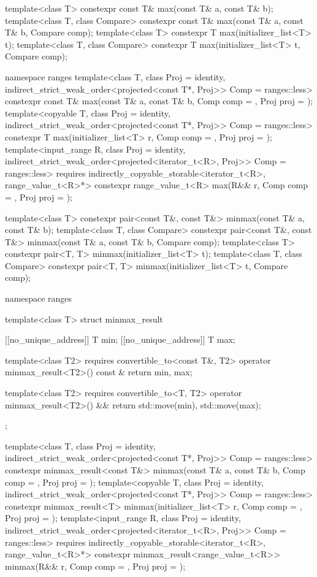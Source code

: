 \begin{codeblock}
{  template<class T> constexpr const T& max(const T& a, const T& b);
  template<class T, class Compare>
    constexpr const T& max(const T& a, const T& b, Compare comp);
  template<class T>
    constexpr T max(initializer_list<T> t);
  template<class T, class Compare>
    constexpr T max(initializer_list<T> t, Compare comp);

  namespace ranges {
    template<class T, class Proj = identity,
             indirect_strict_weak_order<projected<const T*, Proj>> Comp = ranges::less>
      constexpr const T& max(const T& a, const T& b, Comp comp = {}, Proj proj = {});
    template<copyable T, class Proj = identity,
             indirect_strict_weak_order<projected<const T*, Proj>> Comp = ranges::less>
      constexpr T max(initializer_list<T> r, Comp comp = {}, Proj proj = {});
    template<input_range R, class Proj = identity,
             indirect_strict_weak_order<projected<iterator_t<R>, Proj>> Comp = ranges::less>
      requires indirectly_copyable_storable<iterator_t<R>, range_value_t<R>*>
      constexpr range_value_t<R>
        max(R&& r, Comp comp = {}, Proj proj = {});
  }

  template<class T> constexpr pair<const T&, const T&> minmax(const T& a, const T& b);
  template<class T, class Compare>
    constexpr pair<const T&, const T&> minmax(const T& a, const T& b, Compare comp);
  template<class T>
    constexpr pair<T, T> minmax(initializer_list<T> t);
  template<class T, class Compare>
    constexpr pair<T, T> minmax(initializer_list<T> t, Compare comp);

  namespace ranges {
    template<class T>
    struct minmax_result {
      [[no_unique_address]] T min;
      [[no_unique_address]] T max;

      template<class T2>
        requires convertible_to<const T&, T2>
        operator minmax_result<T2>() const & {
          return {min, max};
        }

      template<class T2>
        requires convertible_to<T, T2>
        operator minmax_result<T2>() && {
          return {std::move(min), std::move(max)};
        }
    };

    template<class T, class Proj = identity,
             indirect_strict_weak_order<projected<const T*, Proj>> Comp = ranges::less>
      constexpr minmax_result<const T&>
        minmax(const T& a, const T& b, Comp comp = {}, Proj proj = {});
    template<copyable T, class Proj = identity,
             indirect_strict_weak_order<projected<const T*, Proj>> Comp = ranges::less>
      constexpr minmax_result<T>
        minmax(initializer_list<T> r, Comp comp = {}, Proj proj = {});
    template<input_range R, class Proj = identity,
             indirect_strict_weak_order<projected<iterator_t<R>, Proj>> Comp = ranges::less>
      requires indirectly_copyable_storable<iterator_t<R>, range_value_t<R>*>
      constexpr minmax_result<range_value_t<R>>
        minmax(R&& r, Comp comp = {}, Proj proj = {});
  }

}
\end{codeblock}
